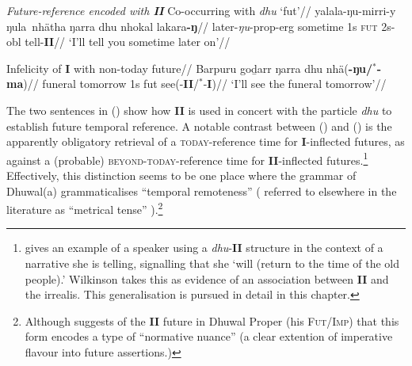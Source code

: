 \pex{} \textit{Future-reference encoded with \textbf{II}}
\a{}\begingl\glpreamble Co-occurring with \textit{dhu} `\gls{fut}'//
\gla yalala-ŋu-mirri-y ŋula~nhätha ŋarra dhu nhokal lakara\textbf{-ŋ}//
\glb later-\textit{ŋu}-\gls{prop}-\gls{erg} sometime 1s \textsc{fut} 2s-\gls{obl} tell-\textbf{II}//
\glft`I'll tell you sometime later on'//
\endgl

\a\begingl\glpreamble Infelicity of \textbf{I} with non-today future//
\gla Barpuru goḏarr ŋarra dhu nhä(\textbf{-ŋu/$^*$-ma})//
\glb funeral tomorrow 1s \gls{fut} see(-\textbf{II}/$^*$-\textbf{I})//
\glft `I'll see the funeral tomorrow'\trailingcitation{[AW~20180730]}//\endgl

\xe

The two sentences in () show how \textbf{II} is used in concert with the particle \textit{dhu} to establish future temporal reference.
  A notable contrast between () and () is the apparently obligatory retrieval of a \textsc{today}-reference time for \textbf{I}-inflected futures, as against a (probable) \textsc{beyond-today}-reference time for \textbf{II}-inflected futures.\footnote{\citet[347]{Wilkinson1991} gives an example of a speaker using a \textit{dhu}-\textbf{II} structure in the context of a narrative she is telling, signalling that she `will (return to the time of the old people).' Wilkinson takes this as evidence of an association between \textbf{II} and the irrealis. This generalisation is pursued in detail in this chapter.} Effectively, this distinction seems to be one place where the grammar of Dhuwal(a) grammaticalises ``temporal remoteness'' (\citet{Comrie1985,Dahl1985} referred to elsewhere in the literature as ``metrical tense'' \citealp[e.g.][204]{Chung}).\footnote{Although \citet[39]{Heath1980} suggests of the \textbf{II} future in Dhuwal Proper (his \textsc{Fut/Imp}) that this form encodes a type of ``normative nuance'' (a clear extention of imperative flavour into future assertions.)}


